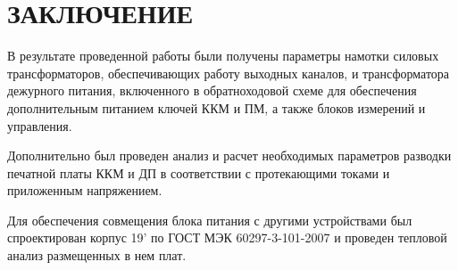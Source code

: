 \documentclass[utf8x, 14pt, oneside, a4paper]{article}
\begin{document}
		
						
	
	\quad
	
	\newpage 
	\titleformat{\section}[display]
	{\normalfont\normalsize\bfseries}{}{0pt}{\normalsize\centering}
	
	\section*{ЗАКЛЮЧЕНИЕ}
	
	
	В результате проведенной работы были получены параметры намотки силовых трансформаторов, обеспечивающих работу выходных каналов, и трансформатора дежурного питания, включенного в обратноходовой схеме для обеспечения дополнительным питанием ключей ККМ и ПМ, а также блоков измерений и управления.
	
	Дополнительно был проведен анализ и расчет необходимых параметров разводки печатной платы ККМ и ДП в соответствии с протекающими токами и приложенным напряжением.
	
	Для обеспечения совмещения блока питания с другими устройствами был спроектирован корпус 19' по ГОСТ МЭК 60297-3-101-2007 и проведен тепловой анализ размещенных в нем плат.
			
	\pagebreak
	
	
	
\end{document}
